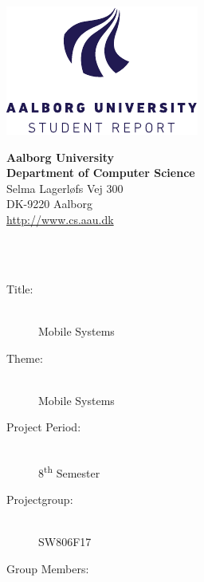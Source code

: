 \begin{titlepage}
    \begin{minipage}{0.4\textwidth}
        \centering
        \includegraphics[width=\textwidth]{img/aau_logo_en.pdf}
    \end{minipage} \hfill
    \begin{minipage}{0.4\textwidth}
        \flushright
        \textbf{Aalborg University}\\
        \textbf{Department of Computer Science}\\
        Selma Lagerløfs Vej 300\\
        DK-9220 Aalborg\\
        \url{http://www.cs.aau.dk}
    \end{minipage}\\
    \vspace{1cm}\\
    \begin{minipage}[t]{0.35\textwidth}
        \begin{description}
            \item[Title:] \hfill\\
                Mobile Systems
            \item[Theme:] \hfill\\
                Mobile Systems
            \item[Project Period:] \hfill\\
                8\textsuperscript{th} Semester
            \item[Projectgroup:] \hfill\\
                SW806F17
            \item[Group Members:] \hfill\\

\end{description}
\end{minipage}
\end{titlepage}
